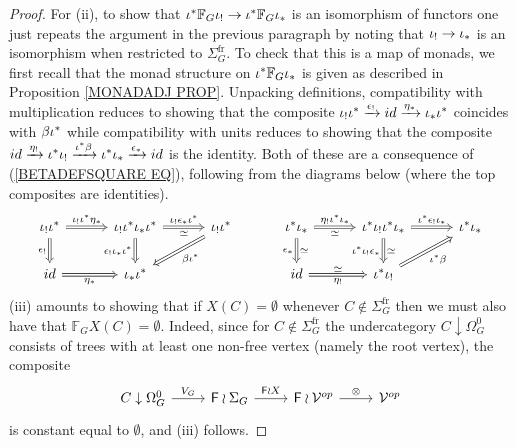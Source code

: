 \documentclass[a4paper,10pt]{article}%
\begin{document}
\begin{proof}
For (ii), to show that 
	$\iota^{\**} \mathbb{F}_G \iota_{!}
	\to	
	\iota^{\**} \mathbb{F}_G \iota_{\**}$ 
is an isomorphism of functors one just repeats the argument in the previous paragraph by noting that $\iota_! \to \iota_{\**}$ is an isomorphism when restricted to $\Sigma_G^{\text{fr}}$.
	To check that this is a map of monads, we first recall  that the monad structure on $\iota^{\**} \mathbb{F}_G \iota_{\**}$
is given as described in Proposition \ref{MONADADJ PROP}.
Unpacking definitions, compatibility with multiplication reduces to showing that the composite 
$\iota_! \iota^{\**} \xrightarrow{\epsilon_!} 
id \xrightarrow{\eta_{\**}} \iota_{\**} \iota^{\**}$
coincides with $\beta \iota^{\**}$
while compatibility with units 
reduces to showing that the composite
$
	id \xrightarrow{\eta_!} 
	\iota^{\**} \iota_! \xrightarrow{\iota^{\**} \beta}
	\iota^{\**} \iota_{\**} \xrightarrow{\epsilon_{\**}}
	id
$
is the identity. Both of these are a consequence of 
(\ref{BETADEFSQUARE EQ}), following from the diagrams below 
(where the top composites are identities).
\[
\begin{tikzcd}[column sep =3em]
		\iota_! \iota^{\**}
		\ar[Rightarrow]{r}{\iota_! \iota^{\**} \eta_{\**}}
		\ar[Rightarrow]{d}[swap]{\epsilon_!}
	&
		\iota_{!} \iota^{\**} \iota_{\**} \iota^{\**}
		\ar[Rightarrow]{d}[swap]{ \epsilon_! \iota_{\**}\iota^{\**}}
		\ar[Rightarrow]{r}[swap]{\simeq}{\iota_{!}\epsilon_{\**}\iota^{\**}}
	&
		\iota_! \iota^{\**}
		\ar[Rightarrow]{ld}{\beta \iota^{\**}}
	&	
		\iota^{\**} \iota_{\**}
		\ar[Rightarrow]{r}{\eta_! \iota^{\**} \iota_{\**}}[swap]{\simeq}
		\ar[Rightarrow]{d}[swap]{\epsilon_{\**}}{\simeq}
	&
		\iota^{\**} \iota_{!} \iota^{\**} \iota_{\**}
		\ar[Rightarrow]{r}{\iota^{\**} \epsilon_! \iota_{\**}}
		\ar[Rightarrow]{d}{\simeq}[swap]{\iota^{\**}\iota_{!}\epsilon_{\**}}
	&
		\iota^{\**}\iota_{\**}
\\
		id
		\ar[Rightarrow]{r}[swap]{\eta_{\**}}
	&
		\iota_{\**} \iota^{\**}
	&
	&	
		id
		\ar[Rightarrow]{r}[swap]{\eta_!}{\simeq}
	&
		\iota^{\**} \iota_!
		\ar[Rightarrow]{ru}[swap]{\iota^{\**} \beta}
\end{tikzcd}
\]
(iii) amounts to showing that if $X(C) =\emptyset$ whenever 
$C \nin \Sigma_G^{\text{fr}}$
then we must also have that
$\mathbb{F}_G X(C) =\emptyset$.
Indeed, since for  
$C \nin \Sigma_G^{\text{fr}}$
the undercategory
$C \downarrow \Omega_{G}^{0}$
consists of trees with at least one non-free vertex (namely the root vertex), the composite
\[
\begin{tikzcd}
	C \downarrow \Omega_{G}^{0} \ar{r}{V_G} &
	\Fin \wr \Sigma_G \ar{r}{\Fin \wr X} &
	\Fin \wr \mathcal{V}^{op} \ar{r}{\otimes}&
	\mathcal{V}^{op}
\end{tikzcd}
\]
is constant equal to $\emptyset$, and (iii) follows.


\end{proof}
\end{document}
